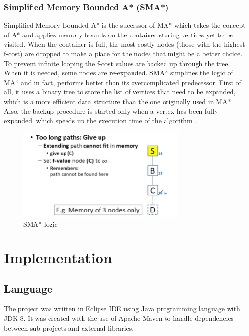 \documentclass[12pt]{article}
\begin{document}
\subsubsection{Simplified Memory Bounded A* (SMA*)}

Simplified Memory Bounded A* is the successor of MA* which takes the concept of A* and applies memory bounds on the container storing vertices yet to be visited. When the container is full, the most costly nodes (those with the highest f-cost) are dropped to make a place for the nodes that might be a better choice. To prevent infinite looping the f-cost values are backed up through the tree. When it is needed, some nodes are re-expanded. SMA* simplifies the logic of MA* and in fact, performs better than its overcomplicated predecessor. First of all, it uses a binary tree to store the list of vertices that need to be expanded, which is a more efficient data structure than the one originally used in MA*. Also, the backup procedure is started only when a vertex has been fully expanded, which speeds up the execution time of the algorithm \cite{GCAI2017:Enhanced_Simplified_Memory_bounded_Star}.

\begin{figure}[h]
    \includegraphics[width=0.75\textwidth]{smastar}
    \centering
    \caption{SMA* logic \cite{smastar_image}}
\end{figure}

\section{Implementation}

\subsection{Language}

The project was written in Eclipse IDE using Java programming language with JDK 8. It was created with the use of Apache Maven to handle dependencies between sub-projects and external libraries.
\end{document}
